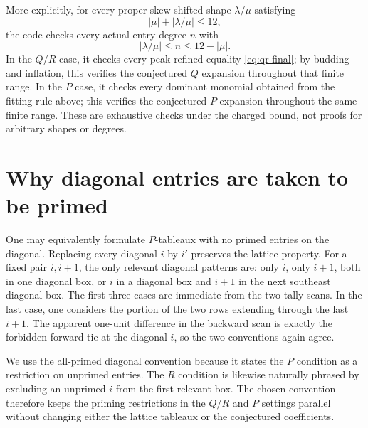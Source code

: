 \documentclass[11pt]{article}
\theoremstyle{definition}
\theoremstyle{remark}
\begin{document}
More explicitly, for every proper skew shifted shape $\lambda/\mu$ satisfying
\[
  |\mu|+|\lambda/\mu|\le 12,
\]
the code checks every actual-entry degree $n$ with
\[
  |\lambda/\mu|\le n\le 12-|\mu|.
\]
In the $Q/R$ case, it checks every peak-refined equality
\eqref{eq:qr-final}; by budding and inflation, this verifies the conjectured
$Q$ expansion throughout that finite range.  In the $P$ case, it checks every
dominant monomial obtained from the fitting rule above; this verifies the
conjectured $P$ expansion throughout the same finite range.  These are
exhaustive checks under the charged bound, not proofs for arbitrary shapes or
degrees.

\section{Why diagonal entries are taken to be primed}
\label{sec:diagonal-choice}

One may equivalently formulate $P$-tableaux with no primed entries on the
diagonal.  Replacing every diagonal $i$ by $i'$ preserves the lattice
property.  For a fixed pair $i,i+1$, the only relevant diagonal patterns are:
only $i$, only $i+1$, both in one diagonal box, or $i$ in a diagonal box and
$i+1$ in the next southeast diagonal box.  The first three cases are immediate
from the two tally scans.  In the last case, one considers the portion of the
two rows extending through the last $i+1$.  The apparent one-unit difference
in the backward scan is exactly the forbidden forward tie at the diagonal
$i$, so the two conventions again agree.

We use the all-primed diagonal convention because it states the $P$ condition
as a restriction on unprimed entries.  The $R$ condition is likewise naturally
phrased by excluding an unprimed $i$ from the first relevant box.  The chosen
convention therefore keeps the priming restrictions in the $Q/R$ and $P$
settings parallel without changing either the lattice tableaux or the
conjectured coefficients.
\end{document}
